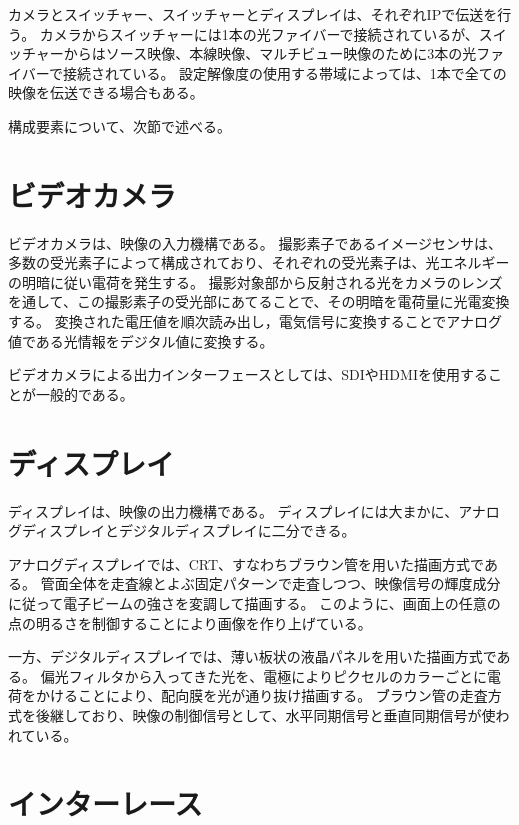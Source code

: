 カメラとスイッチャー、スイッチャーとディスプレイは、それぞれIPで伝送を行う。
カメラからスイッチャーには1本の光ファイバーで接続されているが、スイッチャーからはソース映像、本線映像、マルチビュー映像のために3本の光ファイバーで接続されている。
設定解像度の使用する帯域によっては、1本で全ての映像を伝送できる場合もある。

構成要素について、次節で述べる。

\section{ビデオカメラ}
\label{sec:camera}

ビデオカメラは、映像の入力機構である。
撮影素子であるイメージセンサは、多数の受光素子によって構成されており、それぞれの受光素子は、光エネルギーの明暗に従い電荷を発生する。
撮影対象部から反射される光をカメラのレンズを通して、この撮影素子の受光部にあてることで、その明暗を電荷量に光電変換する。
変換された電圧値を順次読み出し，電気信号に変換することでアナログ値である光情報をデジタル値に変換する。

ビデオカメラによる出力インターフェースとしては、SDIやHDMIを使用することが一般的である。

\section{ディスプレイ}
\label{sec:display}

ディスプレイは、映像の出力機構である。
ディスプレイには大まかに、アナログディスプレイとデジタルディスプレイに二分できる。

アナログディスプレイでは、CRT、すなわちブラウン管を用いた描画方式である。
管面全体を走査線とよぶ固定パターンで走査しつつ、映像信号の輝度成分に従って電子ビームの強さを変調して描画する。
このように、画面上の任意の点の明るさを制御することにより画像を作り上げている。

一方、デジタルディスプレイでは、薄い板状の液晶パネルを用いた描画方式である。
偏光フィルタから入ってきた光を、電極によりピクセルのカラーごとに電荷をかけることにより、配向膜を光が通り抜け描画する。
ブ゙ラウン管の走査方式を後継しており、映像の制御信号として、水平同期信号と垂直同期信号が使われている。

\section{インターレース}
\label{sec:interlace}

